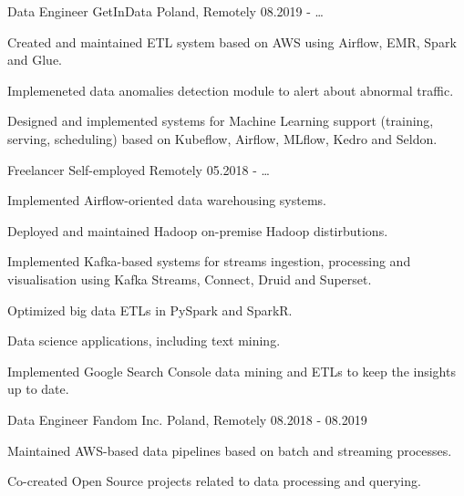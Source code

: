 

\begin{cventries}

  \cventry
    {Data Engineer} %
    {GetInData} %
    {Poland, Remotely} %
    {08.2019 - \ldots} %
    {
      \begin{cvitems} %
        \item {Created and maintained ETL system based on AWS using Airflow, EMR, Spark and Glue.}
        \item {Implemeneted data anomalies detection module to alert about abnormal traffic.}
        \item {Designed and implemented systems for Machine Learning support (training, serving, scheduling) based on Kubeflow, Airflow, MLflow, Kedro and Seldon.}
      \end{cvitems}
    }

  \cventry
    {Freelancer} %
    {Self-employed} %
    {Remotely} %
    {05.2018 - \ldots} %
    {
      \begin{cvitems} %
        \item {Implemented Airflow-oriented data warehousing systems.}
        \item {Deployed and maintained Hadoop on-premise Hadoop distirbutions.}
        \item {Implemented Kafka-based systems for streams ingestion, processing and visualisation using Kafka Streams, Connect, Druid and Superset.}
        \item {Optimized big data ETLs in PySpark and SparkR.}
        \item {Data science applications, including text mining.}
        \item {Implemented Google Search Console data mining and ETLs to keep the insights up to date.}
      \end{cvitems}
    }

  \cventry
    {Data Engineer} %
    {Fandom Inc.} %
    {Poland, Remotely} %
    {08.2018 - 08.2019} %
    {
      \begin{cvitems} %
        \item {Maintained AWS-based data pipelines based on batch and streaming processes.}
        \item {Co-created Open Source projects related to data processing and querying.}
      \end{cvitems}
    }


\end{cventries}
